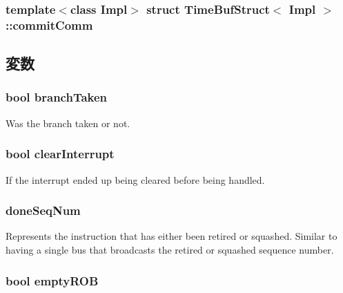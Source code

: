 \subsubsection*{template$<$class Impl$>$ struct TimeBufStruct$<$ Impl $>$::commitComm}



\subsection{変数}
\hypertarget{structTimeBufStruct_1_1commitComm_abea53a673db4866c41444561cbc6dac0}{
\subsubsection[{branchTaken}]{\setlength{\rightskip}{0pt plus 5cm}bool {\bf branchTaken}}}
\label{structTimeBufStruct_1_1commitComm_abea53a673db4866c41444561cbc6dac0}


Was the branch taken or not. \hypertarget{structTimeBufStruct_1_1commitComm_a695ef2b5d408e6ca8b4a3019293ec106}{
\subsubsection[{clearInterrupt}]{\setlength{\rightskip}{0pt plus 5cm}bool {\bf clearInterrupt}}}
\label{structTimeBufStruct_1_1commitComm_a695ef2b5d408e6ca8b4a3019293ec106}


If the interrupt ended up being cleared before being handled. \hypertarget{structTimeBufStruct_1_1commitComm_a45920c1d79a22b1320274c5f53504654}{
\subsubsection[{doneSeqNum}]{ {\bf doneSeqNum}}}
\label{structTimeBufStruct_1_1commitComm_a45920c1d79a22b1320274c5f53504654}
Represents the instruction that has either been retired or squashed. Similar to having a single bus that broadcasts the retired or squashed sequence number. \hypertarget{structTimeBufStruct_1_1commitComm_a145243270bb508720c507e02ad0a8e6a}{
\subsubsection[{emptyROB}]{\setlength{\rightskip}{0pt plus 5cm}bool {\bf emptyROB}}}
\label{structTimeBufStruct_1_1commitComm_a145243270bb508720c507e02ad0a8e6a}


